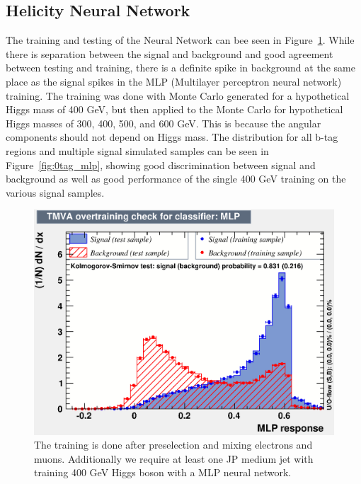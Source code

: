 \subsection{Helicity Neural Network}
The training and testing of the Neural Network can bee seen in Figure~\ref{fig:NNOutput}.  While there is separation between the signal and background and good agreement between testing and training, there is a definite spike in background at the same place as the signal spikes in the MLP (Multilayer perceptron neural network) training. The training was done with Monte Carlo generated for a hypothetical Higgs mass of 400 GeV, but then applied to the Monte Carlo for hypothetical Higgs masses of 300, 400, 500, and 600 GeV. This is because the angular components should not depend on Higgs mass. The distribution for all b-tag regions and multiple signal simulated samples can be seen in Figure~\ref{fig:0tag_mlp}, showing good discrimination between signal and background as well as good performance of the single 400 GeV training on the various signal samples.

\begin{figure}[htb!]
\begin{center}
\centerline{
\includegraphics[width=0.8\linewidth]{Optimization/MLP.eps}
}
\caption{
The training is done after preselection and mixing electrons and muons.  Additionally we require at least one JP medium jet with training 400 GeV Higgs boson with a MLP neural network.
}
\label{fig:NNOutput}
\end{center}
\end{figure}


